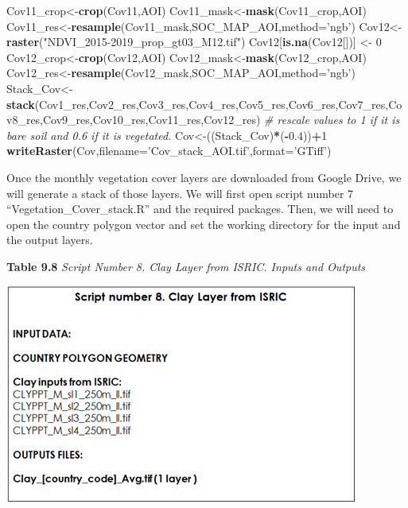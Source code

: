 \documentclass[
  10pt,
  b5paper,
]{book}
\newenvironment{Shaded}{\begin{snugshade}}{\end{snugshade}}
\newcommand{\CommentTok}[1]{\textcolor[rgb]{0.56,0.35,0.01}{\textit{#1}}}
\newcommand{\DataTypeTok}[1]{\textcolor[rgb]{0.13,0.29,0.53}{#1}}
\newcommand{\DecValTok}[1]{\textcolor[rgb]{0.00,0.00,0.81}{#1}}
\newcommand{\FloatTok}[1]{\textcolor[rgb]{0.00,0.00,0.81}{#1}}
\newcommand{\KeywordTok}[1]{\textcolor[rgb]{0.13,0.29,0.53}{\textbf{#1}}}
\newcommand{\NormalTok}[1]{#1}
\newcommand{\OperatorTok}[1]{\textcolor[rgb]{0.81,0.36,0.00}{\textbf{#1}}}
\newcommand{\StringTok}[1]{\textcolor[rgb]{0.31,0.60,0.02}{#1}}
\begin{document}
\begin{Shaded}
\begin{Highlighting}[]
\NormalTok{Cov11_crop<-}\KeywordTok{crop}\NormalTok{(Cov11,AOI)}
\NormalTok{Cov11_mask<-}\KeywordTok{mask}\NormalTok{(Cov11_crop,AOI)}
\NormalTok{Cov11_res<-}\KeywordTok{resample}\NormalTok{(Cov11_mask,SOC_MAP_AOI,}\DataTypeTok{method=}\StringTok{'ngb'}\NormalTok{) }
\NormalTok{Cov12<-}\KeywordTok{raster}\NormalTok{(}\StringTok{"NDVI_2015-2019_prop_gt03_M12.tif"}\NormalTok{)}
\NormalTok{Cov12[}\KeywordTok{is.na}\NormalTok{(Cov12[])] <-}\StringTok{ }\DecValTok{0}
\NormalTok{Cov12_crop<-}\KeywordTok{crop}\NormalTok{(Cov12,AOI)}
\NormalTok{Cov12_mask<-}\KeywordTok{mask}\NormalTok{(Cov12_crop,AOI)}
\NormalTok{Cov12_res<-}\KeywordTok{resample}\NormalTok{(Cov12_mask,SOC_MAP_AOI,}\DataTypeTok{method=}\StringTok{'ngb'}\NormalTok{) }
\NormalTok{Stack_Cov<-}\KeywordTok{stack}\NormalTok{(Cov1_res,Cov2_res,Cov3_res,Cov4_res,Cov5_res,Cov6_res,Cov7_res,Cov8_res,Cov9_res,Cov10_res,Cov11_res,Cov12_res)}
\CommentTok{# rescale values to 1 if it is bare soil and 0.6 if it is vegetated.}
\NormalTok{Cov<-((Stack_Cov)}\OperatorTok{*}\NormalTok{(}\OperatorTok{-}\FloatTok{0.4}\NormalTok{))}\OperatorTok{+}\DecValTok{1}
\KeywordTok{writeRaster}\NormalTok{(Cov,}\DataTypeTok{filename=}\StringTok{'Cov_stack_AOI.tif'}\NormalTok{,}\DataTypeTok{format=}\StringTok{'GTiff'}\NormalTok{)}
\end{Highlighting}
\end{Shaded}

Once the monthly vegetation cover layers are downloaded from Google Drive, we will generate a stack of those layers. We will first open script number 7 ``Vegetation\_Cover\_stack.R'' and the required packages. Then, we will need to open the country polygon vector and set the working directory for the input and the output layers.

\textbf{Table 9.8} \emph{Script Number 8. Clay Layer from ISRIC. Inputs and Outputs}

\includegraphics{tables/Table_9.7.png}
\end{document}
